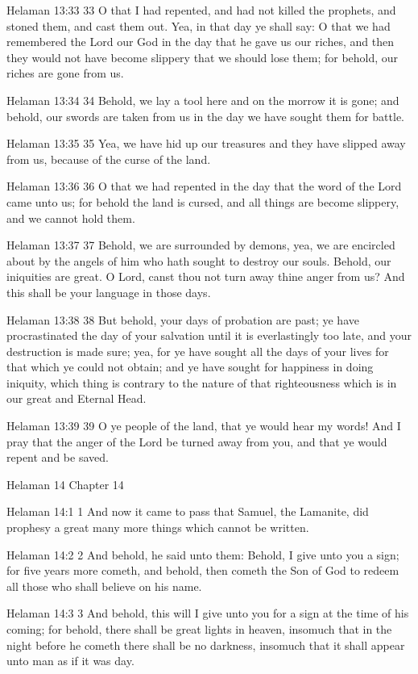 Helaman 13:33
 33 O that I had repented, and had not killed the prophets, and
stoned them, and cast them out. Yea, in that day ye shall say: O
that we had remembered the Lord our God in the day that he gave
us our riches, and then they would not have become slippery that
we should lose them; for behold, our riches are gone from us.

Helaman 13:34
 34 Behold, we lay a tool here and on the morrow it is gone; and
behold, our swords are taken from us in the day we have sought
them for battle.

Helaman 13:35
 35 Yea, we have hid up our treasures and they have slipped away
from us, because of the curse of the land.

Helaman 13:36
 36 O that we had repented in the day that the word of the Lord
came unto us; for behold the land is cursed, and all things are
become slippery, and we cannot hold them.

Helaman 13:37
 37 Behold, we are surrounded by demons, yea, we are encircled
about by the angels of him who hath sought to destroy our souls.
Behold, our iniquities are great. O Lord, canst thou not turn
away thine anger from us? And this shall be your language in
those days.

Helaman 13:38
 38 But behold, your days of probation are past; ye have
procrastinated the day of your salvation until it is
everlastingly too late, and your destruction is made sure; yea,
for ye have sought all the days of your lives for that which ye
could not obtain; and ye have sought for happiness in doing
iniquity, which thing is contrary to the nature of that
righteousness which is in our great and Eternal Head.

Helaman 13:39
 39 O ye people of the land, that ye would hear my words! And I
pray that the anger of the Lord be turned away from you, and that
ye would repent and be saved.

Helaman 14
Chapter 14

Helaman 14:1
 1 And now it came to pass that Samuel, the Lamanite, did
prophesy a great many more things which cannot be written.

Helaman 14:2
 2 And behold, he said unto them: Behold, I give unto you a sign;
for five years more cometh, and behold, then cometh the Son of
God to redeem all those who shall believe on his name.

Helaman 14:3
 3 And behold, this will I give unto you for a sign at the time
of his coming; for behold, there shall be great lights in heaven,
insomuch that in the night before he cometh there shall be no
darkness, insomuch that it shall appear unto man as if it was
day.

